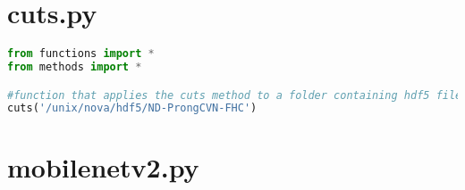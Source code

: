 \section*{cuts.py}

\begin{lstlisting}[language=Python]
from functions import *
from methods import *

#function that applies the cuts method to a folder containing hdf5 files and returns a dataframe
cuts('/unix/nova/hdf5/ND-ProngCVN-FHC')

\end{lstlisting}

\section*{mobilenetv2.py}

